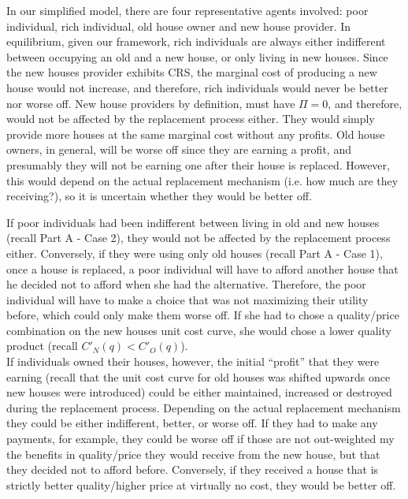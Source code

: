 \documentclass[12pt]{paper}
\begin{document}
In our simplified model, there are four representative agents
involved: poor individual, rich individual, old house owner and new
house provider. In equilibrium, given our framework, rich individuals
are always either indifferent between occupying an old and a new house,
or only living in new houses. Since the new houses provider exhibits
CRS, the marginal cost of producing a new house would not increase,
and therefore, rich individuals would never be better nor worse off.
New house providers by definition, must have $\Pi=0$, and therefore,
would not be affected by the replacement process either. They would
simply provide more houses at the same marginal cost without any
profits.  Old house owners, in general, will be worse off since they
are earning a profit, and presumably they will not be earning one
after their house is replaced. However, this would depend on the
actual replacement mechanism (i.e. how much are they receiving?), so
it is uncertain whether they would be better off.

If poor individuals had been indifferent between living in old and new
houses (recall Part A - Case 2), they would not be affected by the
replacement process either. Conversely, if they were using only old
houses (recall Part A - Case 1), once a house is replaced, a poor
individual will have to afford another house that he decided not to
afford when she had the alternative. Therefore, the poor individual
will have to make a choice that was not maximizing their utility
before, which could only make them worse off. If she had to chose a
quality/price combination on the new houses unit cost curve, she would
chose a lower quality product (recall $C'_N(q)<C'_O(q)$).
\\

If individuals owned their houses, however, the initial ``profit''
that they were earning (recall that the unit cost curve for old houses
was shifted upwards once new houses were introduced) could be either
maintained, increased or destroyed during the replacement
process. Depending on the actual replacement mechanism they could be
either indifferent, better, or worse off. If they had to make any
payments, for example, they could be worse off if those are not
out-weighted my the benefits in quality/price they would receive from
the new house, but that they decided not to afford before. Conversely,
if they received a house that is strictly better quality/higher price
at virtually no cost, they would be better off.
\\
\end{document}

